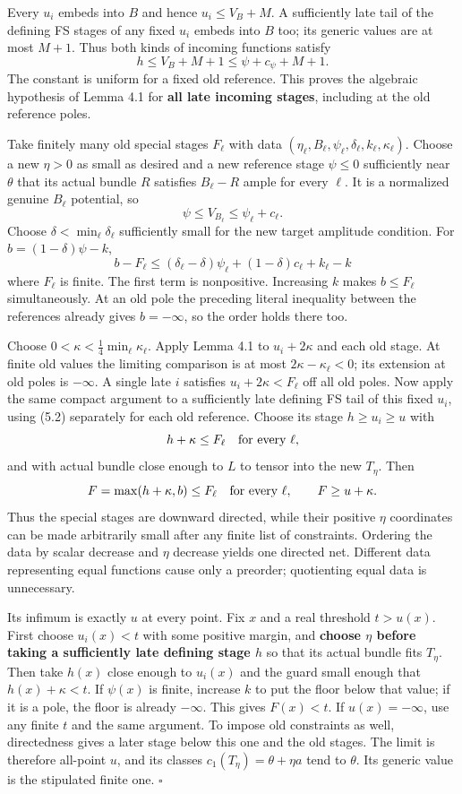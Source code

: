 \documentclass[
  10pt,
]{article}
\begin{document}
Every \(u_i\) embeds into \(B\) and hence \(u_i\leq V_B+M\). A
sufficiently late tail of the defining FS stages of any fixed \(u_i\)
embeds into \(B\) too; its generic values are at most \(M+1\). Thus both
kinds of incoming functions satisfy
\[h\leq V_B+M+1\leq\psi+c_\psi+M+1.\tag{5.2}\] The constant is uniform
for a fixed old reference. This proves the algebraic hypothesis of Lemma
4.1 for \textbf{all late incoming stages}, including at the old
reference poles.

Take finitely many old special stages \(F_\ell\) with data
\((\eta_\ell,B_\ell,\psi_\ell,\delta_\ell,k_\ell,\kappa_\ell)\). Choose
a new \(\eta>0\) as small as desired and a new reference stage
\(\psi\leq0\) sufficiently near \(\theta\) that its actual bundle \(R\)
satisfies \(B_\ell-R\) ample for every \(\ell\). It is a normalized
genuine \(B_\ell\) potential, so
\[\psi\leq V_{B_\ell}\leq\psi_\ell+c_\ell.\] Choose
\(\delta<\min_\ell\delta_\ell\) sufficiently small for the new target
amplitude condition. For \(b=(1-\delta)\psi-k\),
\[b-F_\ell\leq(\delta_\ell-\delta)\psi_\ell
+(1-\delta)c_\ell+k_\ell-k\] where \(F_\ell\) is finite. The first term
is nonpositive. Increasing \(k\) makes \(b\leq F_\ell\) simultaneously.
At an old pole the preceding literal inequality between the references
already gives \(b=-\infty\), so the order holds there too.

Choose \(0<\kappa<\frac14\min_\ell\kappa_\ell\). Apply Lemma 4.1 to
\(u_i+2\kappa\) and each old stage. At finite old values the limiting
comparison is at most \(2\kappa-\kappa_\ell<0\); its extension at old
poles is \(-\infty\). A single late \(i\) satisfies
\(u_i+2\kappa<F_\ell\) off all old poles. Now apply the same compact
argument to a sufficiently late defining FS tail of this fixed \(u_i\),
using (5.2) separately for each old reference. Choose its stage
\(h\geq u_i\geq u\) with
\[h+\kappa\leq F_\ell\quad\hbox{for every }\ell,\] and with actual
bundle close enough to \(L\) to tensor into the new \(T_\eta\). Then
\[F=\max(h+\kappa,b)\leq F_\ell\quad\hbox{for every }\ell,
\qquad F\geq u+\kappa.\] Thus the special stages are downward directed,
while their positive \(\eta\) coordinates can be made arbitrarily small
after any finite list of constraints. Ordering the data by scalar
decrease and \(\eta\) decrease yields one directed net. Different data
representing equal functions cause only a preorder; quotienting equal
data is unnecessary.

Its infimum is exactly \(u\) at every point. Fix \(x\) and a real
threshold \(t>u(x)\). First choose \(u_i(x)<t\) with some positive
margin, and \textbf{choose \(\eta\) before taking a sufficiently late
defining stage \(h\)} so that its actual bundle fits \(T_\eta\). Then
take \(h(x)\) close enough to \(u_i(x)\) and the guard small enough that
\(h(x)+\kappa<t\). If \(\psi(x)\) is finite, increase \(k\) to put the
floor below that value; if it is a pole, the floor is already
\(-\infty\). This gives \(F(x)<t\). If \(u(x)=-\infty\), use any finite
\(t\) and the same argument. To impose old constraints as well,
directedness gives a later stage below this one and the old stages. The
limit is therefore all-point \(u\), and its classes
\(c_1(T_\eta)=\theta+\eta a\) tend to \(\theta\). Its generic value is
the stipulated finite one. \(\square\)
\end{document}
